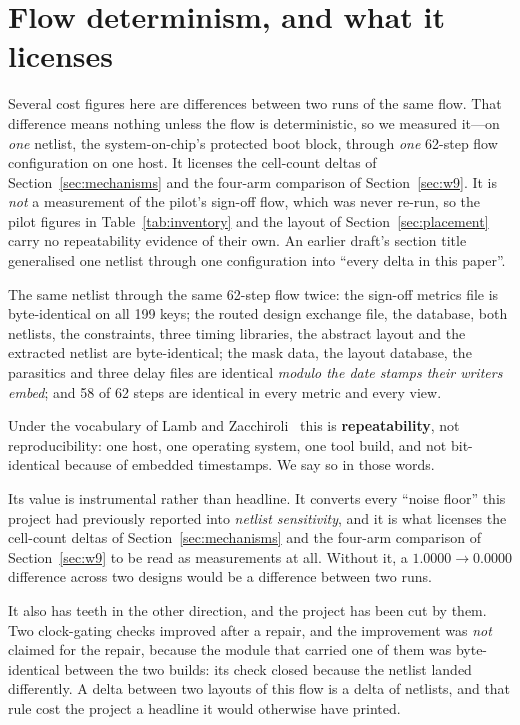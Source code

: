 \documentclass[11pt,a4paper]{article}
\begin{document}
\section{Flow determinism, and what it licenses}
\label{sec:determinism}

Several cost figures here are differences between two runs of the same
flow. That difference means nothing unless the flow is deterministic, so
we measured it---on \emph{one} netlist, the system-on-chip's protected
boot block, through \emph{one} 62-step flow configuration on one host.
It licenses the cell-count deltas of Section~\ref{sec:mechanisms} and
the four-arm comparison of Section~\ref{sec:w9}. It is \emph{not} a
measurement of the pilot's sign-off flow, which was never re-run, so the
pilot figures in Table~\ref{tab:inventory} and the layout of
Section~\ref{sec:placement} carry no repeatability evidence of their
own. An earlier draft's section title generalised one netlist through
one configuration into ``every delta in this paper''.

The same netlist through the same 62-step flow twice: the sign-off
metrics file is byte-identical on all 199 keys; the routed design
exchange file, the database, both netlists, the constraints, three
timing libraries, the abstract layout and the extracted netlist are
byte-identical; the mask data, the layout database, the parasitics and
three delay files are identical \emph{modulo the date stamps their
writers embed}; and 58 of 62 steps are identical in every metric and
every view.

Under the vocabulary of Lamb and Zacchiroli~\cite{lamb2022} this is
\textbf{repeatability}, not reproducibility: one host, one operating
system, one tool build, and not bit-identical because of embedded
timestamps. We say so in those words.

Its value is instrumental rather than headline. It converts every
``noise floor'' this project had previously reported into
\emph{netlist sensitivity}, and it is what licenses the cell-count deltas
of Section~\ref{sec:mechanisms} and the four-arm comparison of
Section~\ref{sec:w9} to be read as measurements at all. Without it, a
$1.0000 \to 0.0000$ difference across two designs would be a difference
between two runs.

It also has teeth in the other direction, and the project has been cut by
them. Two clock-gating checks improved after a repair, and the
improvement was \emph{not} claimed for the repair, because the module
that carried one of them was byte-identical between the two builds: its
check closed because the netlist landed differently. A delta between two
layouts of this flow is a delta of netlists, and that rule cost the
project a headline it would otherwise have printed.
\end{document}
